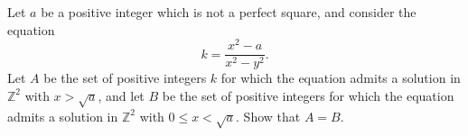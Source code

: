 Let 
$a$
 be a positive integer which is not a perfect square, and consider the equation 
\[k = \frac{x^2-a}{x^2-y^2}.\]
Let 
$A$
 be the set of positive integers 
$k$
 for which the equation admits a solution in 
$\mathbb Z^2$
 with 
$x>\sqrt{a}$, 
 and let 
$B$
 be the set of positive integers for which the equation admits a solution in 
$\mathbb Z^2$
 with 
$0\leq x<\sqrt{a}$. 
 Show that 
$A=B$. 

